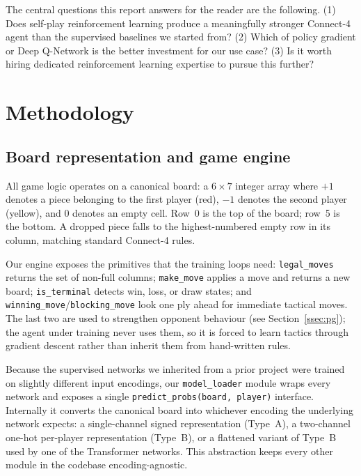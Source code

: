 \documentclass[11pt]{article}
\begin{document}
The central questions this report answers for the reader are the following.
(1) Does self-play reinforcement learning produce a meaningfully stronger
Connect-4 agent than the supervised baselines we started from?
(2) Which of policy gradient or Deep Q-Network is the better investment for
our use case?
(3) Is it worth hiring dedicated reinforcement learning expertise to pursue
this further?

\section{Methodology}
\label{sec:method}

\subsection{Board representation and game engine}
\label{ssec:engine}

All game logic operates on a canonical board: a $6 \times 7$ integer array
where $+1$ denotes a piece belonging to the first player (red), $-1$ denotes
the second player (yellow), and $0$ denotes an empty cell. Row~0 is the top
of the board; row~5 is the bottom. A dropped piece falls to the
highest-numbered empty row in its column, matching standard Connect-4 rules.

Our engine exposes the primitives that the training loops need:
\texttt{legal\_moves} returns the set of non-full columns;
\texttt{make\_move} applies a move and returns a new board;
\texttt{is\_terminal} detects win, loss, or draw states; and
\texttt{winning\_move}/\texttt{blocking\_move} look one ply ahead for
immediate tactical moves. The last two are used to strengthen opponent
behaviour (see Section~\ref{ssec:pg}); the agent under training never uses
them, so it is forced to learn tactics through gradient descent rather than
inherit them from hand-written rules.

Because the supervised networks we inherited from a prior project were
trained on slightly different input encodings, our \texttt{model\_loader}
module wraps every network and exposes a single
\texttt{predict\_probs(board, player)} interface. Internally it converts
the canonical board into whichever encoding the underlying network
expects: a single-channel signed representation (Type~A), a two-channel
one-hot per-player representation (Type~B), or a flattened variant of
Type~B used by one of the Transformer networks. This abstraction keeps
every other module in the codebase encoding-agnostic.
\end{document}
